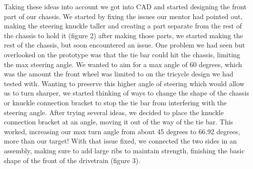 Taking these ideas into account we got into CAD and started designing the front part of our chassis. We started by fixing the issues our mentor had pointed out,  making the steering knuckle taller and creating a part separate from the rest of the chassis to hold it (figure 2) after making those parts, we started making the rest of the chassis, but soon encountered an issue. One problem we had seen but overlooked on the prototype was that the tie bar could hit the chassis, limiting the max steering angle. We wanted to aim for a max angle of 60 degrees, which was the amount the front wheel was limited to on the tricycle design we had tested with. Wanting to preserve this higher angle of steering which would allow us to turn sharper, we started thinking of ways to change the shape of the chassis or knuckle connection bracket to stop the tie bar from interfering with the steering angle. After trying several ideas, we decided to place the knuckle connection bracket at an angle, moving it out of the way of the tie bar. This worked, increasing our max turn angle from about 45 degrees to 66.92 degrees, more than our target! With that issue fixed, we connected the two sides in an assembly, making sure to add large ribs to maintain strength, finishing the basic shape of the front of the drivetrain (figure 3).



